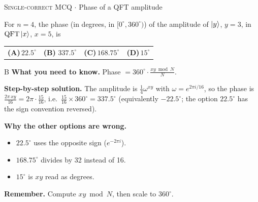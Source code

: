 \documentclass[11pt,a4paper]{article}
\newcommand{\optlabel}[1]{\textbf{(#1)}}
\newcommand{\correctlabel}[1]{\textcolor{okgreen}{\textbf{(#1)}\,\ding{51}}}
\newenvironment{qitem}[1]{\begin{list}{}{\setlength{\leftmargin}{3.3em}\setlength{\labelwidth}{3.1em}%
  \setlength{\labelsep}{0.2em}\setlength{\topsep}{3pt}\setlength{\parsep}{3pt}}\item[\textbf{Q.#1}\hfill]}{\end{list}}
\newcommand{\qsep}{\par\vspace{2pt}{\color{black!15}\hrule}\vspace{4pt}}
\newcommand{\qmeta}[2]{{\footnotesize\color{black!60}\textsc{#1} \;$\cdot$\; #2}\par}
\begin{document}
\begin{qitem}{52}
\qmeta{Single-correct MCQ}{Phase of a QFT amplitude}
For $n = 4$, the phase (in degrees, in $[0^\circ, 360^\circ)$) of the amplitude of $\ket{y}$, $y = 3$, in $\mathrm{QFT}\ket{x}$, $x = 5$, is
\par\smallskip\noindent\begin{tabularx}{\linewidth}{@{}*{4}{L}@{}}
\optlabel{A}\,$22.5^\circ$ & \correctlabel{B}\,$337.5^\circ$ & \optlabel{C}\,$168.75^\circ$ & \optlabel{D}\,$15^\circ$
\end{tabularx}
\end{qitem}
\begin{solbox}{B}
\textbf{\color{brand}What you need to know.} Phase $= 360^\circ\cdot\frac{xy \bmod N}{N}$.

\textbf{\color{brand}Step-by-step solution.} The amplitude is $\frac14\omega^{xy}$ with $\omega = e^{2\pi i/16}$, so the phase is
$\frac{2\pi\,xy}{16} = 2\pi\cdot\frac{15}{16}$, i.e.\ $\frac{15}{16}\times360^\circ = 337.5^\circ$ (equivalently $-22.5^\circ$; the option
$22.5^\circ$ has the sign convention reversed).

\textbf{\color{brand}Why the other options are wrong.}
\begin{itemize}[leftmargin=2.4em, itemsep=1pt, topsep=2pt]
\item[\textbf{(A)}] $22.5^\circ$ uses the opposite sign ($e^{-2\pi i}$).
\item[\textbf{(C)}] $168.75^\circ$ divides by 32 instead of 16.
\item[\textbf{(D)}] $15^\circ$ is $xy$ read as degrees.
\end{itemize}
\textbf{\color{brand}Remember.} Compute $xy \bmod N$, then scale to $360^\circ$.
\end{solbox}
\qsep
\end{document}
